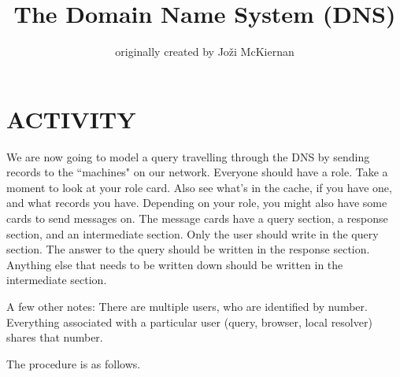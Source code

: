 \documentclass[11pt,a4paper]{article}
\title{The Domain Name System (DNS) \vspace{-2ex}}
\author{originally created by Jo\v{z}i McKiernan}
\date{}
\begin{document}
\maketitle


\section{ACTIVITY}
We are now going to model a query travelling through the DNS by sending records to the ``machines" on our network.
Everyone should have a role. 
Take a moment to look at your role card.
Also see what's in the cache, if you have one, and what records you have.
Depending on your role, you might also have some cards to send messages on.
The message cards have a query section, a response section, and an intermediate section. 
Only the user should write in the query section. 
The answer to the query should be written in the response section. 
Anything else that needs to be written down should be written in the intermediate section.

A few other notes: There are multiple users, who are identified by number. 
Everything associated with a particular user (query, browser, local resolver) shares that number. 


The procedure is as follows.
\end{document}
